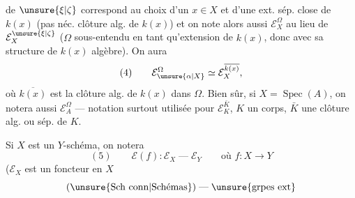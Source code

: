 de $\unsure{\xi|\zeta}$ correspond au choix d'un $x\in X$ et d'une ext. sép. close  \inserted{$\Omega$} de $k(x)$ (pas néc.  clôture alg. de $k(x)$) et on note alors aussi $\mathcal E_X^\Omega$ au lieu de $\mathcal E_X^{\unsure{\xi|\zeta}}$ ($\Omega$ sous-entendu en tant qu'extension de $k(x)$, donc avec sa structure de $k(x)$ algèbre). On aura 
\[
(4)\qquad \mathcal E_{\unsure{\alpha|X}}^\Omega\simeq\mathcal E_X^{\overline{k(x)}},
\]
où $\overline{k(x)}$ est la clôture alg. de $k(x)$ dans $\Omega$. Bien sûr, si $X=\operatorname{Spec}(A)$, on notera aussi $\mathcal E_A^\Omega$ --- notation surtout utilisée pour $\mathcal E_K^{\bar K}$, $K$ un corps, $\bar K$ une clôture alg. ou sép. de $K$.

Si $X$ est un $Y$-schéma,  on notera
\[
(5)\qquad \mathcal E(f):\mathcal E_X\mathrel{\text{---}}\mathcal E_Y\qquad\text{où }f:X\longrightarrow Y
\]
($\mathcal E_X$ est un foncteur en $X$
\[
(\unsure{\text{Sch conn}|\text{Schémas}})\mathrel{\text{---}}\unsure{\text{grpes ext}}
\]
